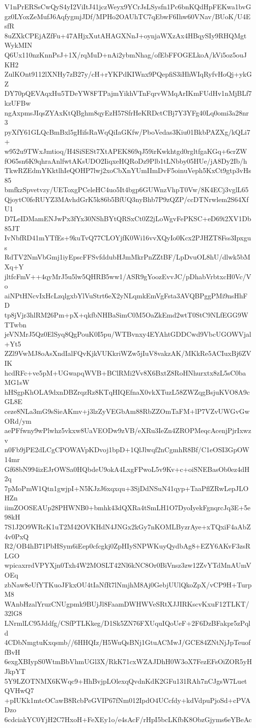 V1nPrERSsCwQyS4yI2ViItJ41jczWeyx9YCrJsLSysfn1Pc6bnKQdHpFEKwa1bvG
gz0LYoxZeMufJ6AqfygmjJDf/MPHo2OAUhTC7qEbwF6Ihw60VNav/BUoK/U4EsfR
8uZXkCPEjAZfFu+47AHjxXutAHAGXNnJ+oynjaWXzAx4HBqySIy9RHQMgtWykMIN
Q6Ux110nzKnnPsJ+1X/rqMuD+nAi2ybmNhag/ofEbFFOGELkoA/kVi5oz5ouJKH2
ZulKOnt9112lXNHy7zB27y/cH+rYKPdKIWnx9PQepfiS3iHhWIqRyfvHoQj+ykGZ
DY70pQEVAqxHu5TDeYW8FTPajmYikhVTnFqrvWMqArIKmFUdHv1nMjBLf7kzUFBw
ngAxpmsJIqsZYAxKtQBghm8qyEzH57SfrHeKRDctCBj7Y3YFg40Lq0omi3a28nr3
pyXfY61GLQcBmBxl5gHifsRaWqQiIaGKfw/PboVedas3Kiu01BkbPAZXg/kQLi7+
w952u9TWxJmtioq/H4SiSESt7XtAPEK869qJ59irKwkhtgd0rgltfgaKGq+6crZW
fO65sn6K9qhraAnlfwtAKsUDO2IiqxeHQRoDz9Plb1tLNbby05HUe/jA8Dy2Ib/h
TkwRZEdmYKktlhIeQOHP7lwj2xoCbXnYUmIImDvF5oinuVeph5KxCt9gtp3vHs85
bmfkzSpvetvzy/UEToxgPCeleHC4uo5It4bgp6GUWnzVhpT0Vw/8K4ECj3vglL65
QjoytC0feRUYZ3MAvhdGrK5k86b5BfUQ3nyBhb7P9zQZP/ccDTNrwlem2S64XfU1
D7LeIDMamENJwPx3fYx30NShBYtQRSxCt0Z2jLoWgvFePKSC+eD69i2XV1Db85JT
IvNbfRD41mYTfEs+9kuTvQ77CLOYjfK0Wi16vvXQyIo0Kcx2PJHZT8Fss3Ipxgus
RdTV2NmVbGmj1iyEpscFFSvfddubHJmMkrPnZZtBF/LpDvuOL8hU/dlwk5bMXq+Y
jltfcFmV++4qyMrJ5u5lw5QHRB5ww1/ASR9gYoozEvvJC/pDhabVrbtxcH0Vc/Vo
aiNPtHNcvIxHcLzqlgxbYlVuStrt6eX2yNLqmkEmVgFsta3AVQBPggPMi9nsHhFD
tp8jVjr3hlRM26Pm+pX+qkfbNHBaSimC0M5OaZkEmd2wtT0StC9NLfEGG9WTTwbn
jeVNMrJ5Qz0ElSyq8QgPouK0I5pu/WTBvnxy4EYAhtGDDCwd9VbcUGOWVjal+Yt5
ZZl9VwMJ8oAsXndIalFQvKjkVUKkriWZw5jIuV8vakzAK/MKkRe5ACIuxBj6ZVIK
hcdRFc+ve5pM+UGwapqWVB+BClRMi2Vv8X6BxtZ8RoHNhurxtx8zL5sC0baMG1sW
hHSgpKhOLA9dxnDBZrqzRz8KTqHIQEfnaX0vkXTuzL58ZWZqgBsjuKVO8A9cGL8E
ceze8NLa3mG9sSieAKmv+j3lzZyVEGbAm88RbZZOmTaFM+lP7VZvUWGvGwORd/ym
aePFfwny9wPlwhz5vkxw8UaVEODw9zVB/eXRu3IeZn4ZROPMeqcAcenjPjrIxwzv
n0Fb9jPE2dLCgCPOWAVpKDvoj1bpD+1QlJlwqf2nCgmhR8Bf/C1eOSI3GpOW14mr
Gf68bN994izEJrOWSa0HQbdeU9okA4LxgFPwoL5v9Kv+c+oiSNEBasOb0ez4dH2q
7pMoPmW1Qtn1gwjpI+N5KJzJ6xqxqu+3SjDdNSuN41qyp+TaaPflZRwLepJLOHZn
iimZOOSEAUp28PHWNB0+bmhk43dQXRa4tSmLH1O7DyoIyekFgnqrcJq3E+5e98kH
7S1J2O9WRcK1uT2M42OVKHdN4JNGx2kGy7nKOMLByzrAye+xTQxiF4aAbZ4v0PxQ
R2/OB4hB71PbHSym6iEep0cfcgkj0ZpHIySNPWKuyQydbAg8+EZY6AKvF3zsRLGO
wpicaxrrdVPYXjn0Txh4W2MOSLT42Nl6kNC8Or0BiVnsz3zw12ZvYTdMnAUmVOEq
zbNaw8eUfYTKuoJFkxOU4tIaNfR7lNmjhM8Aj0GebjUUlQkoZpX/vCP9H+TurpM8
WAnbHzalYruzCNUgpmk9BUjJl8FaamDWHWVeSRtXJJIRKscvKxuF12TLKT/32lG8
LNrmlLC95Jddfg/CSfPTLKkeg/D1Sk5ZN76FXUquIQoUeF+2F6DzBFakpr5zPqld
4CDbNmgtuKxqsmb//6HHQIz/H5WuQsBNj1GtuACMwJ/GCE84ZNtNjJpTeuoffBvH
6exgXBIypS0WtmBbVhmUGl3X/RkK71cxWZAJDhH0W3oX7FezEFsOiZOR5yHJkpYT
5Y9LZOTNMX6KWqc9+HhBvjpLOlexqQvdnKdK2GFu131RAh7nCJgsW7LuetQVHwQ7
+pIUKk1mtcOCawB8RcbPeGVIP67fNm012IpdO4UCcfdy+kdVdpuPjoSd+cPVADzo
6cdciakYC0YjH2C7HxoH+FeXEy1o/e4sAcF/rHpI5bcLKfbK8ObzGjyms6eYBeAc
